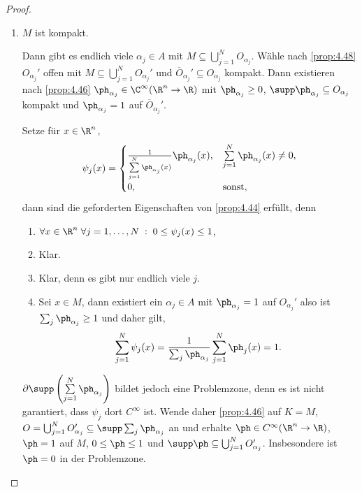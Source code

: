 \begin{proof}
\begin{bemn}
\begin{enumerate}[label=\alph{*})]
\item\label{proof:4.44:1} $M$ ist kompakt.

Dann gibt es endlich viele $\alpha_j\in A$ mit $M \subseteq
\bigcup\limits_{j=1}^N O_{\alpha_j}$. Wähle nach \ref{prop:4.48}
$O_{\alpha_j}'$ offen mit $M \subseteq \bigcup\limits_{j=1}^N O_{\alpha_j}'$ und 
$\overline{O}_{\alpha_j}'\subseteq O_{\alpha_j}$ kompakt. Dann existieren
nach \ref{prop:4.46} $\ph_{\alpha_j}\in\C^\infty(\R^n\to\R)$ mit
$\ph_{\alpha_j} \ge 0$, $\supp \ph_{\alpha_j} \subseteq O_{\alpha_j}$ kompakt
und $\ph_{\alpha_j} = 1$ auf $\overline{O}_{\alpha_j}'$.

Setze für $x\in\R^n$,
\begin{align*}
\psi_j(x) = \begin{cases}
\frac{1}{\sum\limits_{j=1}^N \ph_{\alpha_j}(x)}\ph_{\alpha_j}(x),&
\sum\limits_{j=1}^N \ph_{\alpha_j}(x) \neq 0,\\
0,& \text{sonst},
\end{cases}
\end{align*}
dann sind die geforderten Eigenschaften von \ref{prop:4.44} erfüllt, denn
\begin{enumerate}[label=(\roman{*})]
  \item $\forall x\in\R^n\;\forall j=1,\ldots,N\;:\; 0\le \psi_j(x)\le 1$,
  \item Klar.
  \item Klar, denn es gibt nur endlich viele $j$.
  \item Sei $x\in M$, dann existiert ein $\alpha_j\in A$ mit $\ph_{\alpha_j} =
  1$ auf $O_{\alpha_j}'$ also ist $\sum_j \ph_{\alpha_j} \ge 1$ und daher gilt,
\begin{align*}
\sum\limits_{j=1}^N \psi_j(x) =
\frac{1}{\sum_j\ph_{\alpha_j}}\sum\limits_{j=1}^N \ph_j(x) = 1.
\end{align*}
\end{enumerate}
$\partial\supp\left(\sum\limits_{j=1}^N \ph_{\alpha_j}\right)$ bildet jedoch
eine Problemzone, denn es ist nicht garantiert, dass $\psi_j$ dort $C^\infty$
ist. Wende daher \ref{prop:4.46} auf $K=M$, $O=\bigcup_{j=1}^N
O_{\alpha_j}'\subseteq \supp\sum_j \ph_{\alpha_j}$ an und erhalte $\ph\in C^\infty(\R^n\to\R)$, $\ph=1$ auf $M$, $0\le\ph\le 1$ und $\supp\ph\subseteq \bigcup_{j=1}^N
O_{\alpha_j}'$. Insbesondere ist $\ph=0$ in der Problemzone.


\end{enumerate}
\end{bemn}
\end{proof}
